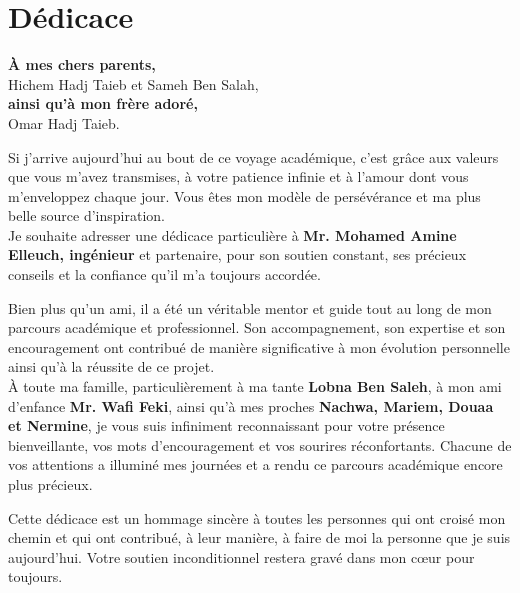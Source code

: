 \newpage
\section*{Dédicace}

\vspace{2cm}

\begin{center}
\Large\textbf{À mes chers parents,}\\
\normalsize Hichem Hadj Taieb et Sameh Ben Salah,\\
\large\textbf{ainsi qu'à mon frère adoré,}\\
\normalsize Omar Hadj Taieb.
\end{center}

\vspace{1.5cm}

Si j'arrive aujourd'hui au bout de ce voyage académique, c'est grâce aux valeurs que vous m'avez transmises, à votre patience infinie et à l'amour dont vous m'enveloppez chaque jour. Vous êtes mon modèle de persévérance et ma plus belle source d'inspiration.\\

Je souhaite adresser une dédicace particulière à \textbf{Mr. Mohamed Amine Elleuch, ingénieur} et partenaire, pour son soutien constant, ses précieux conseils et la confiance qu’il m’a toujours accordée.\

Bien plus qu’un ami, il a été un véritable mentor et guide tout au long de mon parcours académique et professionnel. Son accompagnement, son expertise et son encouragement ont contribué de manière significative à mon évolution personnelle ainsi qu’à la réussite de ce projet.\\


À toute ma famille, particulièrement à ma tante \textbf{Lobna Ben Saleh}, à mon ami d'enfance \textbf{Mr. Wafi Feki}, ainsi qu'à mes proches \textbf{Nachwa, Mariem, Douaa et Nermine}, je vous suis infiniment reconnaissant pour votre présence bienveillante, vos mots d'encouragement et vos sourires réconfortants. Chacune de vos attentions a illuminé mes journées et a rendu ce parcours académique encore plus précieux.

Cette dédicace est un hommage sincère à toutes les personnes qui ont croisé mon chemin et qui ont contribué, à leur manière, à faire de moi la personne que je suis aujourd'hui. Votre soutien inconditionnel restera gravé dans mon cœur pour toujours.